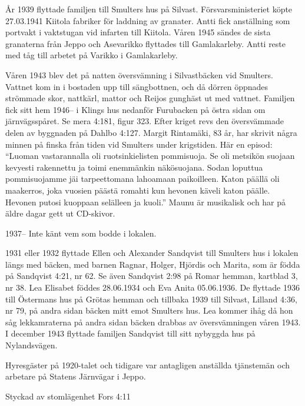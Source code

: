 År 1939 flyttade familjen till Smulters hus på Silvast. Försvarsministeriet köpte 27.03.1941 Kiitola fabriker för laddning av	granater. Antti fick anställning som portvakt i vaktstugan vid infarten till Kiitola. Våren 1945 sändes de sista granaterna från Jeppo och Asevarikko flyttades till Gamlakarleby. Antti reste med tåg till arbetet på Varikko i Gamlakarleby.

Våren 1943 blev det på natten översvämning i Silvastbäcken vid Smulters. Vattnet kom in i bostaden upp till sängbottnen, och då dörren öppnades strömmade skor, nattkärl, mattor och Reijos gunghäst ut med vattnet. Familjen fick sitt hem 1946-- i Klings hus nedanför Furubacken på östra sidan om 	järnvägsspåret. Se mera 4:181, figur 323. Efter kriget revs den översvämmade delen av byggnaden på Dahlbo 4:127. Margit Rintamäki, 83 år, har	skrivit några minnen på finska från tiden vid Smulters under krigstiden. Här en episod: ``Luoman vastarannalla oli ruotsinkielisten pommisuoja. Se oli metsikön suojaan kevyesti rakennettu ja toimi enemmänkin näkösuojana. Sodan loputtua pommisuojamme jäi tarpeettomana lahoamaan paikoilleen. Katon päällä oli maakerros, joka vuosien päästä romahti kun hevonen käveli katon päälle. Hevonen putosi kuoppaan selälleen ja kuoli.''  Maunu är musikalisk och har på äldre dagar gett ut CD-skivor.

1937-- Inte känt vem som bodde i lokalen.

1931 eller 1932 flyttade Ellen och Alexander Sandqvist till Smulters	hus i lokalen längs med bäcken, med barnen Ragnar, Holger, Hjördis	och Marita, som är födda på Sandqvist 4:21, nr 62. Se även Sandqvist	2:98 på Romar hemman, kartblad 3, nr 38. Lea Elisabet föddes 28.06.1934 och Eva Anita 05.06.1936. De flyttade 1936 till Östermans hus på Grötas hemman och	tillbaka 1939 till Silvast, Lilland 4:36, nr 79, på andra sidan bäcken mitt emot Smulters hus. Lea kommer ihåg då hon såg lekkamraterna på andra sidan bäcken drabbas av översvämningen våren 1943. I december 1943 flyttade familjen Sandqvist till sitt nybyggda hus på Nylandsvägen.

Hyresgäster på 1920-talet och tidigare var antagligen anställda tjänstemän och arbetare på Statens Järnvägar i Jeppo.




Styckad av stomlägenhet Fors 4:11


